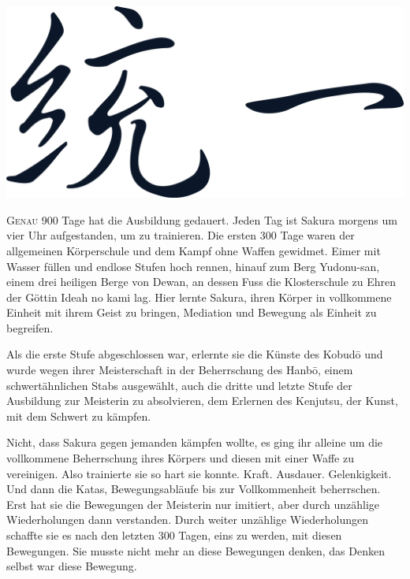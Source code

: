 ﻿\thispagestyle{empty}
\begin{center}
\includegraphics[width=\textwidth]{./bilder/vereinigung.png}
\end{center}
\vspace*{\fill}
{\centering\fontsize{50}{48} \color{farbe}\par}
\newpage
\lettrine[lines=3, lhang=.2, loversize=.25, lraise=0.05, findent=0.1em,
nindent=0em]{G}{enau} 900 Tage hat die Ausbildung gedauert. Jeden Tag ist Sakura morgens um vier Uhr aufgestanden, um zu trainieren. Die ersten 300 Tage waren der allgemeinen Körperschule und dem Kampf ohne Waffen gewidmet. Eimer mit Wasser füllen und endlose Stufen hoch rennen, hinauf zum Berg Yudonu-san, einem drei heiligen Berge von Dewan, an dessen Fuss die Klosterschule zu Ehren der Göttin Ideah no kami lag. Hier lernte Sakura, ihren Körper in vollkommene Einheit mit ihrem Geist zu bringen, Mediation und Bewegung als Einheit zu begreifen.

Als die erste Stufe abgeschlossen war, erlernte sie die Künste des Kobudō und wurde wegen ihrer Meisterschaft in der Beherrschung des Hanbō, einem schwertähnlichen Stabs ausgewählt, auch die dritte und letzte Stufe der Ausbildung zur Meisterin zu absolvieren, dem Erlernen des Kenjutsu, der Kunst, mit dem Schwert zu kämpfen.

Nicht, dass Sakura gegen jemanden kämpfen wollte, es ging ihr alleine um die vollkommene Beherrschung ihres Körpers und diesen mit einer Waffe zu vereinigen. Also trainierte sie so hart sie konnte. Kraft. Ausdauer. Gelenkigkeit. Und dann die Katas, Bewegungsabläufe bis zur Vollkommenheit beherrschen. Erst hat sie die Bewegungen der Meisterin nur imitiert, aber durch unzählige Wiederholungen dann verstanden. Durch weiter unzählige Wiederholungen schaffte sie es nach den letzten 300 Tagen, eins zu werden, mit diesen Bewegungen. Sie musste nicht mehr an diese Bewegungen denken, das Denken selbst war diese Bewegung.


